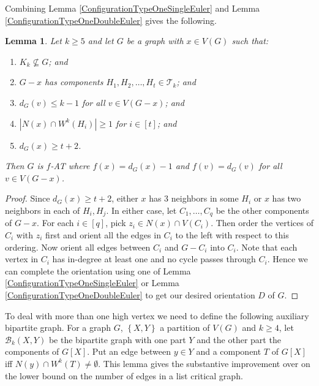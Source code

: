 \documentclass[12pt]{article}
\theoremstyle{plain}
\newtheorem{lem}[thm]{Lemma}
\theoremstyle{definition}
\theoremstyle{remark}
\newcommand{\fancy}[1]{\mathcal{#1}}
\newcommand{\T}{\fancy{T}}
\newcommand{\B}{\fancy{B}}
\newcommand{\set}[1]{\left\{ #1 \right\}}
\newcommand{\card}[1]{\left|#1\right|}
\newcommand{\irange}[1]{\left[#1\right]}
\begin{document}
Combining Lemma \ref{ConfigurationTypeOneSingleEuler} and Lemma \ref{ConfigurationTypeOneDoubleEuler} gives the following.

\begin{lem}\label{ConfigurationTypeOneEuler}
Let $k \geq 5$ and let $G$ be a graph with $x \in V(G)$ such that:
\begin{enumerate}
\item $K_k \not \subseteq G$; and
\item $G-x$ has components $H_1, H_2, \ldots, H_t \in \T_k$; and
\item $d_G(v) \leq k - 1$ for all $v \in V(G-x)$; and
\item $\card{N(x) \cap W^k(H_i)} \geq 1$ for $i \in \irange{t}$; and
\item $d_G(x) \geq t+2$.
\end{enumerate}

\noindent Then $G$ is $f$-AT where $f(x) = d_G(x) - 1$ and $f(v) = d_G(v)$ for all $v \in V(G - x)$.
\end{lem}
\begin{proof}
Since $d_G(x) \geq t+2$, either $x$ has $3$ neighbors in some $H_i$ or $x$ has two neighbors in each of $H_i, H_j$.  In either case, let $C_1, \ldots, C_q$ be the other components of $G-x$.  For each $i \in \irange{q}$, pick $z_i \in N(x) \cap V(C_i)$.  Then order the vertices of $C_i$ with $z_i$ first and orient all the edges in $C_i$ to the left with respect to this ordering.  Now orient all edges between $C_i$ and $G-C_i$ into $C_i$.  Note that each vertex in $C_i$ has in-degree at least one and no cycle passes through $C_i$. Hence we can complete the orientation using one of Lemma \ref{ConfigurationTypeOneSingleEuler} or Lemma \ref{ConfigurationTypeOneDoubleEuler} to get our desired orientation $D$ of $G$.
\end{proof}

To deal with more than one high vertex we need to define the following auxiliary bipartite graph.  For a graph $G$, $\set{X, Y}$ a partition of $V(G)$ and $k \geq 4$, let $\B_k(X, Y)$ be the bipartite graph with one part $Y$ and the other part the components of $G[X]$.  Put an edge between $y \in Y$ and a component $T$ of $G[X]$ iff $N(y) \cap W^k(T) \neq \emptyset$.  This lemma gives the substantive improvement over \cite{kostochkastiebitzedgesincriticalgraph} on the lower bound on the number of edges in a list critical graph.
\end{document}
